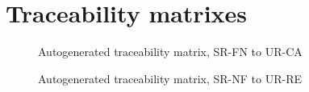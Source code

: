 \documentclass[a4paper,10pt]{article}
\begin{document}
  \printtesttemplate





  \FloatBarrier



  \section{Traceability matrixes}

  \begin{figure}[htbp]
    \centering\traceabilityFNCA
    \caption{Autogenerated traceability matrix, SR-FN to UR-CA}
  \end{figure}

  \begin{figure}[htbp]
    \centering\traceabilityNFRE
    \caption{Autogenerated traceability matrix, SR-NF to UR-RE}
  \end{figure}
\end{document}
